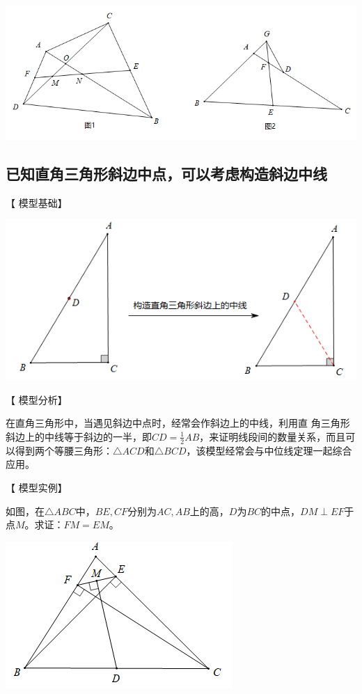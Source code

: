 \documentclass[10pt]{ctexart}
\begin{document}
\begin{center}
	\includegraphics[scale=0.6]{figure/zhongdian14}
\end{center}




\subsection{已知直角三角形斜边中点，可以考虑构造斜边中线}

【 {\heiti 模型基础}】

\begin{center}
	\includegraphics[scale=0.6]{figure/zhongdian15}
\end{center}

【 {\heiti 模型分析}】

在直角三角形中，当遇见斜边中点时，经常会作斜边上的中线，利用直
角三角形斜边上的中线等于斜边的一半，即$CD=\frac{1}{2}AB$，来证明线段间的数量关系，而且可以得到两个等腰三角形：$\triangle ACD$和$\triangle BCD$，该模型经常会与中位线定理一起综合应用。


【 {\heiti 模型实例}】

\begin{shaded}
如图，在$\triangle ABC$中，$BE,CF$分别为$AC,AB$上的高，$D$为$BC$的中点，$DM\perp EF$于点$M$。求证：$FM=EM$。
\end{shaded}

\begin{flushright}
	\includegraphics[scale=0.6]{figure/zhongdian16}
\end{flushright}
\end{document}
